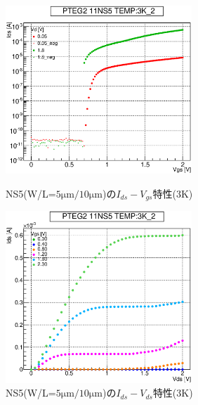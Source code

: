 				\begin{figure}[htbp]
					\begin{minipage}{0.5\hsize}
						\begin{center}
							\includegraphics[width=70mm]{./Chapter/Appendix/Picture/NST/NS5/PTEG2_11_NS5_IdVg_3K_2.eps}
						\end{center}
						\caption{NS5(W/L=$5\mathrm{\mu m}/10\mathrm{\mu m}$)の$I_{ds}-V_{gs}$特性(3K)}
						\label{fig:NS5_IdVg_3K}
					\end{minipage}
					\begin{minipage}{0.5\hsize}
						\begin{center}
							\includegraphics[width=70mm]{./Chapter/Appendix/Picture/NST/NS5/PTEG2_11_NS5_IdVd_3K_2.eps}
						\end{center}
						\caption{NS5(W/L=$5\mathrm{\mu m}/10\mathrm{\mu m}$)の$I_{ds}-V_{ds}$特性(3K)}
						\label{fig:NS5_IdVd_3K}
					\end{minipage}
				\end{figure}
